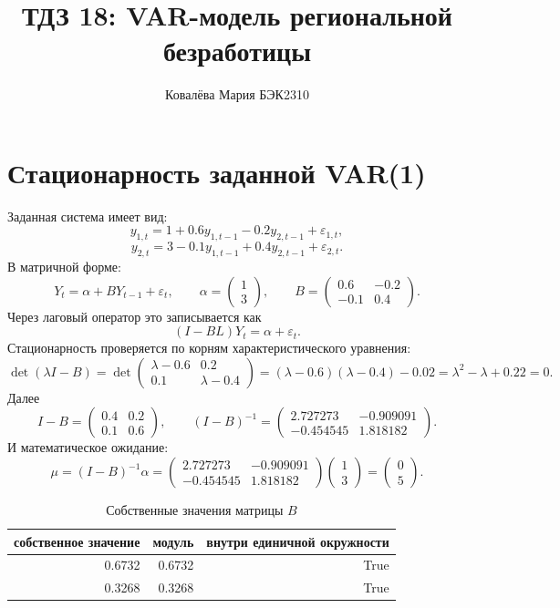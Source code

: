 \documentclass[12pt,a4paper]{article}
\title{ТДЗ 18: VAR-модель региональной безработицы}
\author{Ковалёва Мария БЭК2310}
\date{}
\begin{document}
\maketitle
\thispagestyle{empty}
\section{Стационарность заданной VAR(1)}
Заданная система имеет вид:
\[
y_{1,t} = 1 + 0.6 y_{1,t-1} - 0.2 y_{2,t-1} + \varepsilon_{1,t},
\]
\[
y_{2,t} = 3 - 0.1 y_{1,t-1} + 0.4 y_{2,t-1} + \varepsilon_{2,t}.
\]
В матричной форме:
\[
Y_t = \alpha + B Y_{t-1} + \varepsilon_t,
\qquad
\alpha = \begin{pmatrix}1\\3\end{pmatrix},
\qquad
B = \begin{pmatrix}0.6 & -0.2\\-0.1 & 0.4\end{pmatrix}.
\]
Через лаговый оператор это записывается как
\[
(I - BL)Y_t = \alpha + \varepsilon_t.
\]
Стационарность проверяется по корням характеристического уравнения:
\[
\det(\lambda I - B) = \det\begin{pmatrix}\lambda - 0.6 & 0.2\\0.1 & \lambda - 0.4\end{pmatrix} = (\lambda - 0.6)(\lambda - 0.4) - 0.02 = \lambda^2 - \lambda + 0.22 = 0.
\]
Далее
\[
I-B = \begin{pmatrix}0.4 & 0.2\\0.1 & 0.6\end{pmatrix},
\qquad
(I-B)^{-1} = \begin{pmatrix}2.727273 & -0.909091\\-0.454545 & 1.818182\end{pmatrix}.
\]
И математическое ожидание:
\[
\mu = (I - B)^{-1}\alpha = \begin{pmatrix}2.727273 & -0.909091\\-0.454545 & 1.818182\end{pmatrix}\begin{pmatrix}1\\3\end{pmatrix}= \begin{pmatrix}0\\5\end{pmatrix}.
\]
\begin{table}[H]
\centering
\caption{Собственные значения матрицы $B$}
\label{tab:manual_stationarity}
\normalsize
\begin{tabular}{rrr}
\toprule
собственное значение & модуль & внутри единичной окружности \\
\midrule
0.6732 & 0.6732 & True \\
0.3268 & 0.3268 & True \\
\bottomrule
\end{tabular}
\end{table}
\end{document}
